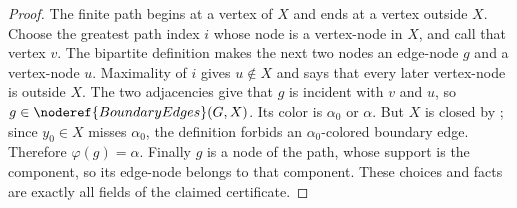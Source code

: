 \begin{proof}
The finite path begins at a vertex of $X$ and ends at a vertex outside
$X$.  Choose the greatest path index $i$ whose node is a vertex-node in
$X$, and call that vertex $v$.  The bipartite definition
 makes the next two nodes an edge-node
$g$ and a vertex-node $u$.  Maximality of $i$ gives $u\notin X$ and says
that every later vertex-node is outside $X$.  The two adjacencies give
that $g$ is incident with $v$ and $u$, so
$g\in\noderef{BoundaryEdges}(G,X)$.  Its color is $\alpha_0$ or
$\alpha$.  But $X$ is closed by ; since
$y_0\in X$ misses $\alpha_0$, the definition
 forbids an $\alpha_0$-colored boundary
edge.  Therefore $\varphi(g)=\alpha$.  Finally $g$ is a node of the path,
whose support is the component, so its edge-node belongs to that
component.  These choices and facts are exactly all fields of the
claimed  certificate.
\end{proof}

